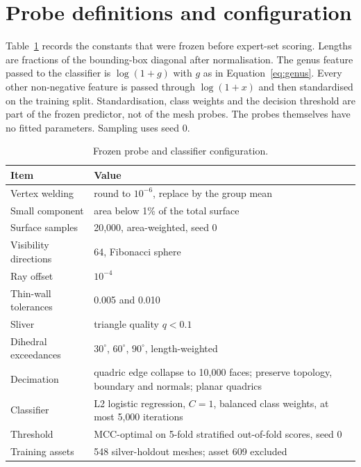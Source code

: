 \section{Probe definitions and configuration}
\label{app:probes}

Table~\ref{tab:config} records the constants that were frozen before expert-set scoring.
Lengths are fractions of the bounding-box diagonal after normalisation.
The genus feature passed to the classifier is \(\log(1+g)\) with \(g\) as in Equation~\eqref{eq:genus}.
Every other non-negative feature is passed through \(\log(1+x)\) and then standardised on the training split.
Standardisation, class weights and the decision threshold are part of the frozen predictor, not of the mesh probes.
The probes themselves have no fitted parameters.
Sampling uses seed 0.

\begin{table}[t]
  \centering
  \caption{Frozen probe and classifier configuration.}
  \label{tab:config}
  \small
  \begin{tabular}{lp{8.6cm}}
    \toprule
    Item & Value \\
    \midrule
    Vertex welding & round to \(10^{-6}\), replace by the group mean \\
    Small component & area below 1\% of the total surface \\
    Surface samples & 20{,}000, area-weighted, seed 0 \\
    Visibility directions & 64, Fibonacci sphere \\
    Ray offset & \(10^{-4}\) \\
    Thin-wall tolerances & 0.005 and 0.010 \\
    Sliver & triangle quality \(q < 0.1\) \\
    Dihedral exceedances & \(30^\circ\), \(60^\circ\), \(90^\circ\), length-weighted \\
    Decimation & quadric edge collapse to 10{,}000 faces; preserve topology, boundary and normals; planar quadrics \\
    Classifier & L2 logistic regression, \(C = 1\), balanced class weights, at most 5{,}000 iterations \\
    Threshold & MCC-optimal on 5-fold stratified out-of-fold scores, seed 0 \\
    Training assets & 548 silver-holdout meshes; asset 609 excluded \\
    \bottomrule
  \end{tabular}
\end{table}

